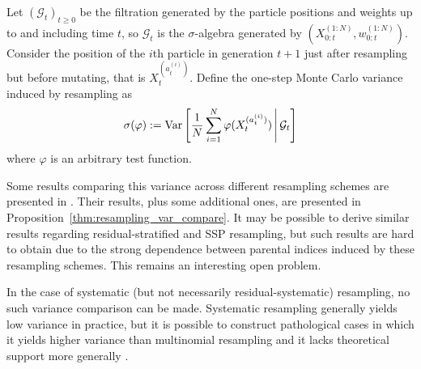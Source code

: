 Let $(\mathcal{G}_t)_{t\geq0}$ be the filtration generated by the particle positions and weights up to and including time $t$, so $\mathcal{G}_t$ is the $\sigma$-algebra generated by $( X_{0:t}^{(1:N)} , w_{0:t}^{(1:N)} )$.
Consider the position of the $i$th particle in generation $t+1$ just after resampling but before mutating, that is $X_t^{(a_t^{(i)})}$.
Define the one-step Monte Carlo variance induced by resampling as
\begin{equation}\label{eq:resamplingMCvariance}
\sigma(\varphi) 
:= \operatorname{Var}\left[ \frac{1}{N} \sum_{i=1}^N \varphi ( X_t^{(a_t^{(i)})} ) \,\middle|\, \mathcal{G}_t \right]
\end{equation}
where $\varphi$ is an arbitrary test function.

Some results comparing this variance across different resampling schemes are presented in \textcite{douc2005}. 
Their results, plus some additional ones, are presented in Proposition~\ref{thm:resampling_var_compare}.
It may be possible to derive similar results regarding residual-stratified and SSP resampling, but such results are hard to obtain due to the strong dependence between parental indices induced by these resampling schemes. 
This remains an interesting open problem.

In the case of systematic (but not necessarily residual-systematic) resampling, no such variance comparison can be made. Systematic resampling generally yields low variance in practice, but it is possible to construct pathological cases in which it yields higher variance than multinomial resampling \parencite[Section 3.4]{douc2005} and it lacks theoretical support more generally \parencite[e.g.][Section 3.3]{gerber2017}.

